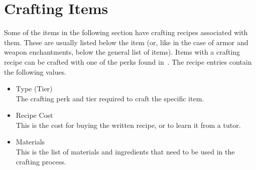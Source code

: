 \chapter{Crafting Items}\label{sec:itemCrafting}
Some of the items in the following section have crafting recipes associated with them.
These are usually listed below the item (or, like in the case of armor and weapon enchantments, below the general list of items).
Items with a crafting recipe can be crafted with one of the perks found in~.
The recipe entries contain the following values.\\

\begin{itemize}
    \item Type (Tier)\\
    The crafting perk and tier required to craft the specific item.
    \item Recipe Cost\\
    This is the cost for buying the written recipe, or to learn it from a tutor.
    \item Materials\\
    This is the list of materials and ingredients that need to be used in the crafting process.
\end{itemize}